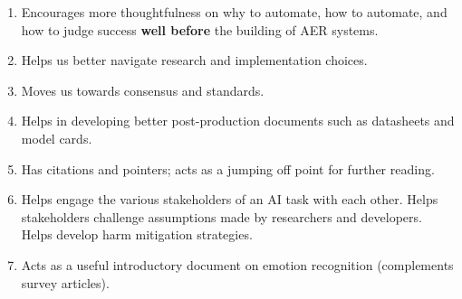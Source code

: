 \documentclass{clv3}
\begin{document}
\begin{enumerate}
     \item Encourages more thoughtfulness on why to automate, how to automate, and how to judge success 
      \textbf{well before} the building of AER systems.\\[-20pt]
    \item Helps us better navigate research and implementation choices.
    \vspace*{-1mm}
        \item Moves us towards consensus and  standards.
        \vspace*{-1mm}
    \item Helps in developing better post-production documents such as datasheets and model cards.
    \vspace*{-1mm}
    \item Has citations and pointers; acts as a jumping off point for further reading.
    \vspace*{-1mm}
    \item Helps engage the various stakeholders of an AI task with each other. Helps stakeholders challenge assumptions made by researchers and developers. Helps develop harm mitigation strategies.
    \vspace*{-1mm}
    \item Acts as a useful introductory document on emotion recognition (complements survey articles).
\end{enumerate}
\end{document}
